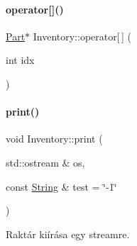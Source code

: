 \paragraph{\texorpdfstring{operator[]()}{operator[]()}\hspace{0.1cm}{\footnotesize\ttfamily [2/2]}}
{\footnotesize\ttfamily \mbox{\hyperlink{class_part}{Part}}$\ast$ Inventory\+::operator\mbox{[}$\,$\mbox{]} (\begin{DoxyParamCaption}\item[{int}]{idx }\end{DoxyParamCaption})\hspace{0.3cm}{\ttfamily [inline]}}

\mbox{\label{class_inventory_ae141405ba9deea67f5c1be1850d136fe}} 
\paragraph{\texorpdfstring{print()}{print()}}
{\footnotesize\ttfamily void Inventory\+::print (\begin{DoxyParamCaption}\item[{std\+::ostream \&}]{os,  }\item[{const \mbox{\hyperlink{class_string}{String}} \&}]{test = {\ttfamily \char`\"{}-\/1\char`\"{}} }\end{DoxyParamCaption})}



Raktár kiírása egy streamre. 

